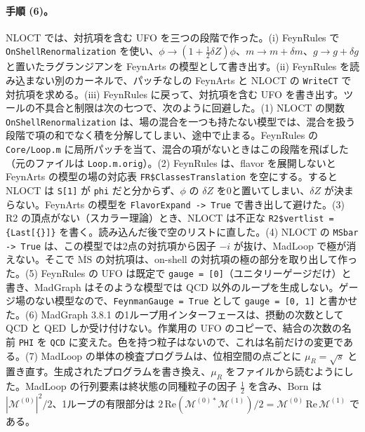 \documentclass[a4paper,10pt]{ltjsarticle}
\begin{document}
\paragraph{手順 (6)。}NLOCT では、対抗項を含む UFO を三つの段階で作った。(i) FeynRules で \texttt{OnShellRenormalization} を使い、$\phi\to(1+\frac12\delta Z)\phi$、$m\to m+\delta m$、$g\to g+\delta g$ と置いたラグランジアンを FeynArts の模型として書き出す。(ii) FeynRules を読み込まない別のカーネルで、パッチなしの FeynArts と NLOCT の \texttt{WriteCT} で対抗項を求める。(iii) FeynRules に戻って、対抗項を含む UFO を書き出す。ツールの不具合と制限は次の七つで、次のように回避した。(1) NLOCT の関数 \texttt{OnShell\allowbreak Renormalization} は、場の混合を一つも持たない模型では、混合を扱う段階で項の和でなく積を分解してしまい、途中で止まる。FeynRules の \texttt{Core/Loop.m} に局所パッチを当て、混合の項がないときはこの段階を飛ばした（元のファイルは \texttt{Loop.m.orig}）。(2) FeynRules は、flavor を展開しないと FeynArts の模型の場の対応表 \texttt{FR\$ClassesTranslation} を空にする。すると NLOCT は \texttt{S[1]} が \texttt{phi} だと分からず、$\phi$ の $\delta Z$ を0と置いてしまい、$\delta Z$ が決まらない。FeynArts の模型を \texttt{FlavorExpand -> True} で書き出して避けた。(3) R2 の頂点がない（スカラー理論）とき、NLOCT は不正な \texttt{R2\$vertlist = \{Last[\{\}]\}} を書く。読み込んだ後で空のリストに直した。(4) NLOCT の \texttt{MSbar -> True} は、この模型では2点の対抗項から因子 $-i$ が抜け、MadLoop で極が消えない。そこで $\overline{\mathrm{MS}}$ の対抗項は、on-shell の対抗項の極の部分を取り出して作った。(5) FeynRules の UFO は既定で \texttt{gauge = [0]}（ユニタリーゲージだけ）と書き、MadGraph はそのような模型では QCD 以外のループを生成しない。ゲージ場のない模型なので、\texttt{FeynmanGauge = True} として \texttt{gauge = [0, 1]} と書かせた。(6) MadGraph 3.8.1 の1ループ用インターフェースは、摂動の次数として QCD と QED しか受け付けない。作業用の UFO のコピーで、結合の次数の名前 \texttt{PHI} を \texttt{QCD} に変えた。色を持つ粒子はないので、これは名前だけの変更である。(7) MadLoop の単体の検査プログラムは、位相空間の点ごとに $\mu_R=\sqrt s$ と置き直す。生成されたプログラムを書き換え、$\mu_R$ をファイルから読むようにした。MadLoop の行列要素は終状態の同種粒子の因子 $\frac12$ を含み、Born は $|\mathcal{M}^{(0)}|^2/2$、1ループの有限部分は $2\,\mathrm{Re}(\mathcal{M}^{(0)*}\mathcal{M}^{(1)})/2=\mathcal{M}^{(0)}\,\mathrm{Re}\,\mathcal{M}^{(1)}$ である。
\end{document}
